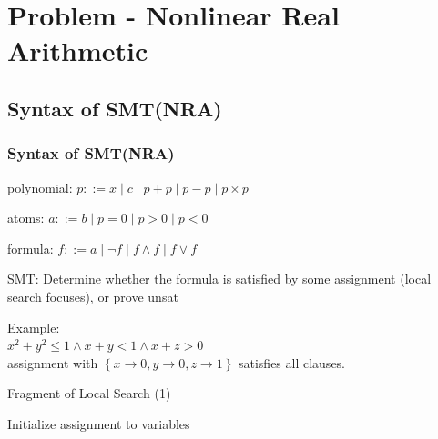 \frame[plain]{\titlepage}

\section{Problem - Nonlinear Real Arithmetic}
\subsection{Syntax of SMT(NRA)}

\begin{frame}
    \frametitle{Syntax of SMT(NRA)}
    
    polynomial: $p ::= x \mid c \mid p + p \mid p - p \mid p \times p$

    atoms: $a ::= b \mid p = 0 \mid p > 0 \mid p < 0$

    formula: $f ::= a \mid \neg f \mid f \wedge f \mid f \vee f $

    \vspace{0.4cm}

    SMT: Determine whether the formula is satisfied by some assignment (local search focuses), or prove unsat

    \vspace{0.4cm}

    Example:
    \\
    $x^2 + y^2 \le 1 \wedge x + y < 1 \wedge x + z > 0$
    \\
    assignment with $\left\{x \rightarrow 0, y \rightarrow 0, z \rightarrow 1\right\}$ satisfies all clauses.
\end{frame}

\begin{frame}{Fragment of Local Search (1)}
    \begin{algorithm}[H]
    \SetAlgoLined
Initialize assignment to variables\;
    \caption{Basic Fragment of Local Search}
    \end{algorithm}
\end{frame}


